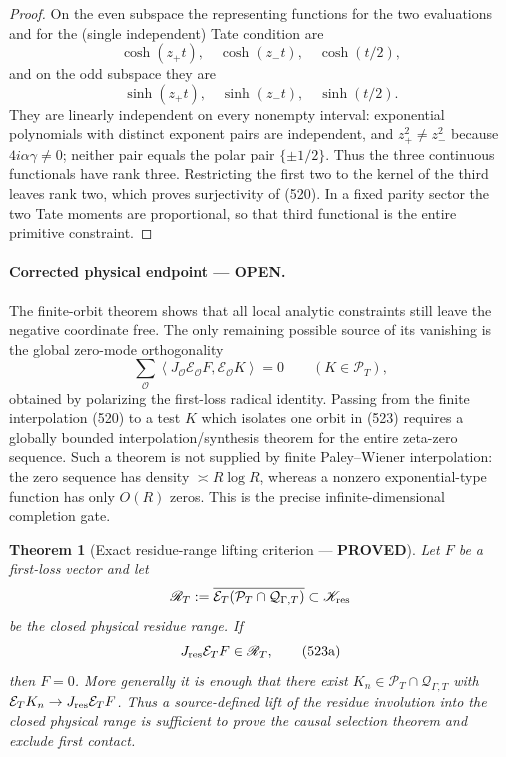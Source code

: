 \documentclass[11pt]{article}
\newtheorem{theorem}{Theorem}
\newcommand{\PROVED}{\textcolor{green!45!black}{\textbf{PROVED}}}
\newcommand{\OPEN}{\textcolor{red!70!black}{\textbf{OPEN}}}
\begin{document}
\begin{proof}
On the even subspace the representing functions for the two evaluations
and for the (single independent) Tate condition are
\begin{equation}
 \cosh(z_+t),\quad\cosh(z_-t),\quad\cosh(t/2),               \tag{521}
\end{equation}
and on the odd subspace they are
\begin{equation}
 \sinh(z_+t),\quad\sinh(z_-t),\quad\sinh(t/2).               \tag{522}
\end{equation}
They are linearly independent on every nonempty interval: exponential
polynomials with distinct exponent pairs are independent, and
\(z_+^2\ne z_-^2\) because \(4i\alpha\gamma\ne0\); neither pair equals
the polar pair \(\{\pm1/2\}\).  Thus the three continuous functionals have
rank three.  Restricting the first two to the kernel of the third leaves
rank two, which proves surjectivity of (520).  In a fixed parity sector the
two Tate moments are proportional, so that third functional is the entire
primitive constraint.
\end{proof}

\paragraph{Corrected physical endpoint --- \OPEN.}
The finite-orbit theorem shows that all local analytic constraints still
leave the negative coordinate free.  The only remaining possible source
of its vanishing is the global zero-mode orthogonality
\begin{equation}
 \sum_{\mathcal O}\left\langle
 J_{\mathcal O}\mathcal E_{\mathcal O}F,
 \mathcal E_{\mathcal O}K\right\rangle=0
 \qquad(K\in\mathcal P_T),                              \tag{523}
\end{equation}
obtained by polarizing the first-loss radical identity.  Passing from the
finite interpolation (520) to a test \(K\) which isolates one orbit in
(523) requires a globally bounded interpolation/synthesis theorem for the
entire zeta-zero sequence.  Such a theorem is not supplied by finite
Paley--Wiener interpolation: the zero sequence has density
\(\asymp R\log R\), whereas a nonzero exponential-type function has only
\(O(R)\) zeros.  This is the precise infinite-dimensional completion gate.

\begin{theorem}[Exact residue-range lifting criterion --- \PROVED]
Let \(F\) be a first-loss vector and let
\[
 \mathscr R_T:=
 \overline{\mathcal E_T(\mathcal P_T\cap\mathcal Q_{\Gamma,T})}
 \subset\mathscr K_{\rm res}
\]
be the closed physical residue range.  If
\begin{equation}
 J_{\rm res}\mathcal E_TF\in\mathscr R_T,             \tag{523a}
\end{equation}
then \(F=0\).  More generally it is enough that there exist
\(K_n\in\mathcal P_T\cap\mathcal Q_{\Gamma,T}\) with
\(\mathcal E_TK_n\to J_{\rm res}\mathcal E_TF\).
Thus a source-defined lift of the residue involution into the closed
physical range is sufficient to prove the causal selection theorem and
exclude first contact.
\end{theorem}
\end{document}
